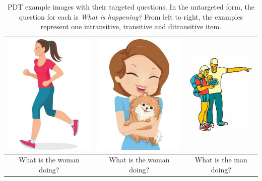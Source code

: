 \begin{table}[htb!]
\begin{center}
\begin{tabular}{|c|c|c|}
\hline
{\includegraphics[width=0.29\columnwidth]{figures/I30.jpg}} & {\includegraphics[width=0.3\columnwidth]{figures/I29.jpg}} & {\includegraphics[width=0.3\columnwidth]{figures/I28.jpg}} \\
\hline
What is the woman doing? & What is the woman doing? & What is the man doing? \\
\hline
\end{tabular}
\caption{\label{tab:example-pdt-items} PDT example images with their targeted questions. In the untargeted form, the question for each is \textit{What is happening?} From left to right, the examples represent one intransitive, transitive and ditransitive item.}
\end{center}
\end{table}


